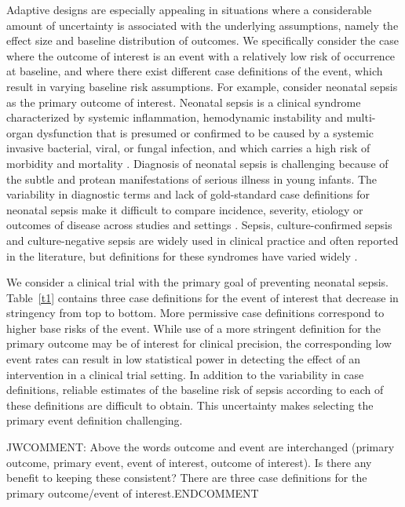 \documentclass[12pt]{article}
\begin{document}
Adaptive designs are especially appealing in situations where a considerable amount of uncertainty is associated with the underlying assumptions, namely the effect size and baseline distribution of outcomes. We specifically consider the case where the outcome of interest is an event with a relatively low risk of occurrence at baseline, and where there exist different case definitions of the event, which result in varying baseline risk assumptions. For example, consider neonatal sepsis as the primary outcome of interest.  Neonatal sepsis is a clinical syndrome characterized by systemic inflammation, hemodynamic instability and multi-organ dysfunction that is presumed or confirmed to be caused by a systemic invasive bacterial, viral, or fungal infection, and which carries a high risk of morbidity and
mortality \citep{ShaSanSto17, Wyn16}. Diagnosis of neonatal sepsis is challenging because of the subtle and protean manifestations of
serious illness in young infants.  The variability in diagnostic terms and lack of gold-standard case definitions for neonatal sepsis make it difficult to compare incidence, severity, etiology or outcomes of disease across studies
and settings \citep{SinDeuSey16}. Sepsis, culture-confirmed sepsis and culture-negative sepsis are widely used in clinical practice and often reported in the literature, but definitions for these syndromes have varied widely \citep{ShaSanSto17, Wyn16, VerButCai16, VerSeaFit2017}. 

We consider a clinical trial with the primary goal of preventing neonatal sepsis. Table~\ref{t1} contains three case definitions for the event of interest that decrease in stringency from top to bottom. More permissive case definitions correspond to higher base risks of the event. While use of a more stringent definition for the primary outcome may be of interest for clinical precision, the corresponding low event rates can result in low statistical power in detecting the effect of an intervention in a clinical trial setting. In addition to the variability in case definitions, reliable estimates of the baseline risk of sepsis according to each of these definitions are difficult to obtain. This uncertainty makes selecting the primary event definition challenging.

JWCOMMENT: Above the words outcome and event are interchanged (primary outcome, primary event, event of interest, outcome of interest). Is there any benefit to keeping these consistent?  There are three case definitions for the primary outcome/event of interest.ENDCOMMENT 
\end{document}
